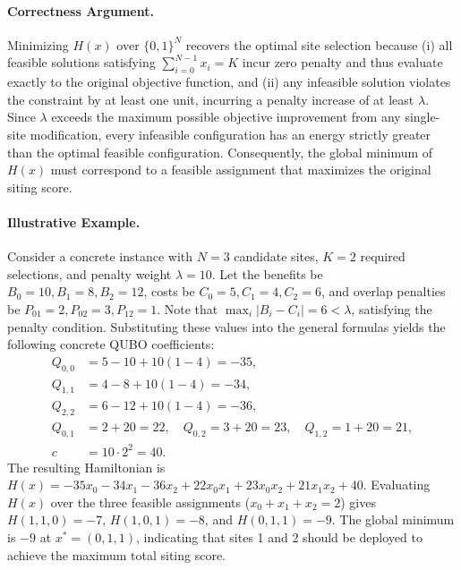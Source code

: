 \documentclass[12pt]{article}
\begin{document}
\paragraph{Correctness Argument.}
Minimizing $H(x)$ over $\{0,1\}^N$ recovers the optimal site selection because (i) all feasible solutions satisfying $\sum_{i=0}^{N-1} x_i = K$ incur zero penalty and thus evaluate exactly to the original objective function, and (ii) any infeasible solution violates the constraint by at least one unit, incurring a penalty increase of at least $\lambda$. Since $\lambda$ exceeds the maximum possible objective improvement from any single-site modification, every infeasible configuration has an energy strictly greater than the optimal feasible configuration. Consequently, the global minimum of $H(x)$ must correspond to a feasible assignment that maximizes the original siting score.

\paragraph{Illustrative Example.}
Consider a concrete instance with $N=3$ candidate sites, $K=2$ required selections, and penalty weight $\lambda=10$. Let the benefits be $B_0=10, B_1=8, B_2=12$, costs be $C_0=5, C_1=4, C_2=6$, and overlap penalties be $P_{01}=2, P_{02}=3, P_{12}=1$. Note that $\max_{i} |B_i - C_i| = 6 < \lambda$, satisfying the penalty condition. Substituting these values into the general formulas yields the following concrete QUBO coefficients:
\begin{align}
  Q_{0,0} &= 5 - 10 + 10(1 - 4) = -35, \\
  Q_{1,1} &= 4 - 8 + 10(1 - 4) = -34, \\
  Q_{2,2} &= 6 - 12 + 10(1 - 4) = -36, \\
  Q_{0,1} &= 2 + 20 = 22, \quad Q_{0,2} = 3 + 20 = 23, \quad Q_{1,2} = 1 + 20 = 21, \\
  c &= 10 \cdot 2^2 = 40.
\end{align}
The resulting Hamiltonian is $H(x) = -35x_0 - 34x_1 - 36x_2 + 22x_0x_1 + 23x_0x_2 + 21x_1x_2 + 40$. Evaluating $H(x)$ over the three feasible assignments ($x_0+x_1+x_2=2$) gives $H(1,1,0)=-7$, $H(1,0,1)=-8$, and $H(0,1,1)=-9$. The global minimum is $-9$ at $x^*=(0,1,1)$, indicating that sites 1 and 2 should be deployed to achieve the maximum total siting score.
\end{document}
